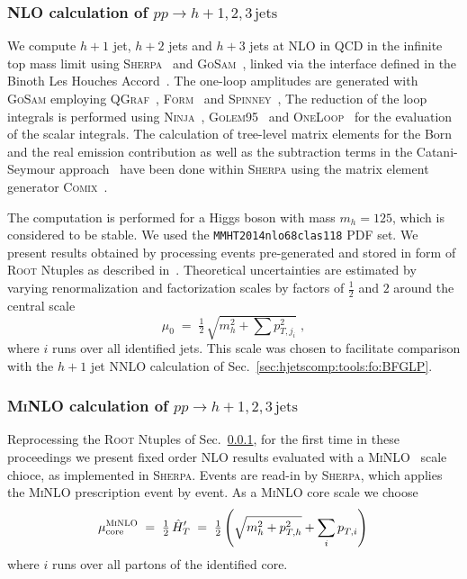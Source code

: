 \subsubsection{NLO calculation of $pp\to h+1,2,3\,\text{jets}$}
\label{sec:hjetscomp:tools:fo:hnj}

We compute $h+1$ jet, $h+2$ jets and
$h+3$ jets at NLO in QCD in the infinite top mass limit
using \textsc{Sherpa}~\cite{Gleisberg:2008ta} and
\textsc{GoSam}~\cite{Cullen:2011ac,Cullen:2014yla}, linked via the
interface defined in the Binoth Les Houches
Accord~\cite{Binoth:2010xt,Alioli:2013nda}.
The one-loop amplitudes are generated with \textsc{GoSam} employing
\textsc{QGraf}~\cite{Nogueira:1991ex},
\textsc{Form}~\cite{Vermaseren:2000nd,Kuipers:2012rf} and
\textsc{Spinney}~\cite{Cullen:2010jv}, The reduction of the loop
integrals is performed using
\textsc{Ninja}~\cite{Mastrolia:2012bu,vanDeurzen:2013saa,Peraro:2014cba},
\textsc{Golem95}~\cite{Heinrich:2010ax,Binoth:2008uq,Cullen:2011kv}
and \textsc{OneLoop}~\cite{vanHameren:2010cp} for the evaluation of
the scalar integrals.
The calculation of tree-level matrix elements for the Born and the
real emission contribution as well as the subtraction terms in the
Catani-Seymour approach~\cite{Catani:1996vz} have been done within
\textsc{Sherpa} using the matrix element generator
\textsc{Comix}~\cite{Gleisberg:2008fv}.

The computation is performed for a Higgs boson with mass
$m_h=125$, which is considered to be stable. We used the 
\texttt{MMHT2014nlo68clas118} PDF set. We present results 
obtained by processing events pre-generated and
stored in form of \textsc{Root} Ntuples as described
in~\cite{Bern:2013zja}. Theoretical
uncertainties are estimated by varying renormalization and
factorization scales by factors of $\tfrac{1}{2}$ and $2$ 
around the central scale
\begin{equation}
  \mu_0 \;=\; \tfrac{1}{2}\,\sqrt{m_{h}^2+\sum p_{T,j_i}^2}\;,
\end{equation}
where $i$ runs over all identified jets.
This scale was chosen to facilitate comparison with the $h+1$ jet NNLO
calculation of Sec.\ \ref{sec:hjetscomp:tools:fo:BFGLP}.


\subsubsection{\textsc{MiNLO} calculation of $pp\to h+1,2,3\,\text{jets}$}
\label{sec:hjetscomp:tools:fo:hnjminlo}

Reprocessing the \textsc{Root} Ntuples of Sec.\ 
\ref{sec:hjetscomp:tools:fo:hnj}, for the first time in these 
proceedings we present fixed order NLO results evaluated with a
\textsc{MiNLO}~\cite{Hamilton:2012np} scale chioce, as implemented in
\textsc{Sherpa}. Events are read-in by \textsc{Sherpa}, which applies
the \textsc{MiNLO} prescription event by event. As a \textsc{MiNLO}
core scale we choose
\begin{equation} \label{eq:hthatprime}
  \mu_\text{core}^\text{\textsc{MiNLO}}
  \;=\;\tfrac{1}{2}\,\hat{H}^\prime_T
  \;=\;\tfrac{1}{2}\left(\sqrt{m_h^{2}+p_{T,h}^{2}}
       +\sum_{i}p_{T,i}^{}\right)\,
\end{equation}
where $i$ runs over all partons of the identified core.

